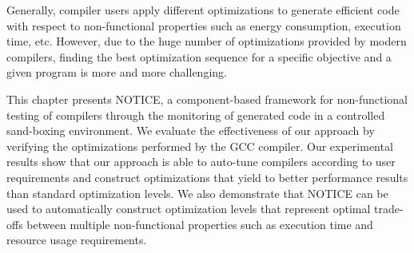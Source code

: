 
Generally, compiler users apply different optimizations to generate efficient code with respect to non-functional properties such as energy consumption, execution time, etc. However, due to the huge number of optimizations provided by modern compilers, finding the best optimization sequence for a specific objective and a given program is more and more challenging. 
	
This chapter presents NOTICE, a component-based framework for non-functional testing of compilers through the monitoring of generated code in a controlled sand-boxing environment.
We evaluate the effectiveness of our approach by verifying the optimizations performed by the GCC compiler.
Our experimental results show that our approach is able to auto-tune compilers according to user requirements and construct optimizations that yield to better performance results than standard optimization levels.
We also demonstrate that NOTICE can be used to automatically construct optimization levels that represent optimal trade-offs between multiple non-functional properties such as execution time and resource usage requirements.
	
	
	
